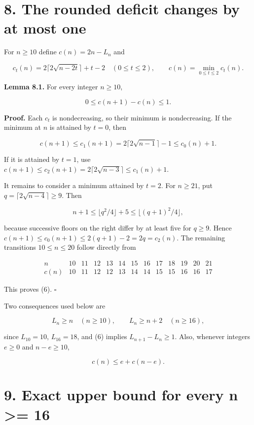 \documentclass[11pt,a4paper]{article}
\begin{document}
\hypertarget{the-rounded-deficit-changes-by-at-most-one}{%
\section{8. The rounded deficit changes by at most one}\label{the-rounded-deficit-changes-by-at-most-one}}

For \(n\ge10\) define \(c(n)=2n-L_n\) and

\[ c_t(n)=2\lceil2\sqrt{n-2t}\rceil+t-2\quad(0\le t\le2),
\qquad c(n)=\min_{0\le t\le2}c_t(n). \]

\textbf{Lemma 8.1.} For every integer \(n\ge10\),

\[ 0\le c(n+1)-c(n)\le1. \tag{6} \]

\textbf{Proof.} Each \(c_t\) is nondecreasing, so their minimum is nondecreasing. If the minimum at \(n\) is attained by \(t=0\), then

\[ c(n+1)\le c_1(n+1)
=2\lceil2\sqrt{n-1}\rceil-1\le c_0(n)+1. \]

If it is attained by \(t=1\), use \(c(n+1)\le c_2(n+1)=2\lceil2\sqrt{n-3}\rceil\le c_1(n)+1\).

It remains to consider a minimum attained by \(t=2\). For \(n\ge21\), put \(q=\lceil2\sqrt{n-4}\rceil\ge9\). Then

\[ n+1\le\lfloor q^2/4\rfloor+5
\le\lfloor(q+1)^2/4\rfloor, \]

because successive floors on the right differ by at least five for \(q\ge9\). Hence \(c(n+1)\le c_0(n+1)\le2(q+1)-2=2q=c_2(n)\). The remaining transitions \(10\le n\le20\) follow directly from

\[
\begin{array}{c|rrrrrrrrrrrr}
n&10&11&12&13&14&15&16&17&18&19&20&21\\\hline
c(n)&10&11&12&12&13&14&14&15&15&16&16&17
\end{array}
\]

This proves (6). \(\square\)

Two consequences used below are

\[ L_n\ge n\quad(n\ge10),\qquad L_n\ge n+2\quad(n\ge16), \tag{7} \]

since \(L_{10}=10\), \(L_{16}=18\), and (6) implies \(L_{n+1}-L_n\ge1\). Also, whenever integers \(e\ge0\) and \(n-e\ge10\),

\[ c(n)\le e+c(n-e). \tag{8} \]

\hypertarget{exact-upper-bound-for-every-n-16}{%
\section{9. Exact upper bound for every n \textgreater= 16}\label{exact-upper-bound-for-every-n-16}}
\end{document}

